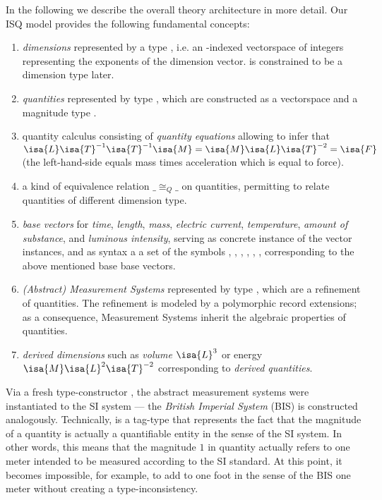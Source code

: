 \documentclass[11pt,a4paper]{book}
\begin{document}
In the following we describe the overall theory architecture in more detail.
Our ISQ model provides the following fundamental concepts:
%
\begin{enumerate}%
\item \emph{dimensions} represented by a type  , i.e. an -indexed
      vectorspace of integers representing the exponents of the dimension vector. 
       is constrained to be a dimension type later.


\item \emph{quantities} represented by type , which are constructed as 
      a  vectorspace and a magnitude type . 

\item{quantity calculus} consisting of \emph{quantity equations} allowing to infer that 
      $\isa{L}\isa{T}^{-1}\isa{T}^{-1}\isa{M} = \isa{M}\isa{L}\isa{T}^{-2} = \isa{F} $ 
      (the left-hand-side equals mass times acceleration which is equal to force). 

\item a kind of equivalence relation $\_\cong_{Q}\_$ on quantities, permitting to relate
      quantities of different dimension type.


\item \emph{base vectors} for
      \emph{time}, \emph{length}, \emph{mass}, \emph{electric current},
      \emph{temperature}, \emph{amount of substance}, and \emph{luminous intensity}, 
      serving as concrete instance of the vector instances, and as syntax a
      a set of the symbols  , , , ,  
      \isa{{\isasymTheta}}, ,   corresponding to the above mentioned base 
      base vectors.

\item \emph{(Abstract) Measurement Systems} represented by type 
      , which are a refinement
      of quantities. The refinement is modeled by a polymorphic record extensions; as a 
      consequence, Measurement Systems inherit the algebraic properties of quantities.
 

\item \emph{derived dimensions} such as \emph{volume} $\isa{L}^3$ or energy 
      $\isa{M}\isa{L}^2\isa{T}^{-2}$ corresponding to \emph{derived quantities}.

\end{enumerate}

Via a fresh type-constructor , the abstract measurement systems were instantiated
to the SI system --- the \emph{British Imperial System} (BIS) is constructed analogously.
Technically,  is a tag-type that represents the fact that the magnitude of a quantity is
actually a quantifiable entity in the sense of the SI system. In other words, this means that the 
magnitude $1$ in quantity  actually refers to one meter intended to be measured 
according to the SI standard. At this point, it becomes impossible, for example, to add to one 
foot in the sense of the BIS one meter without creating a type-inconsistency.
\end{document}

